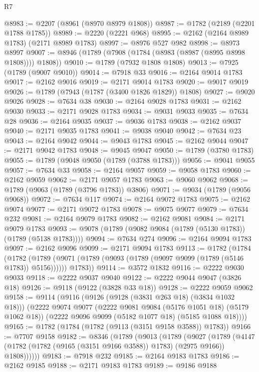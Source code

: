 \begin{lexlean}{R7}
\begin{coremodule}
@8983 := @2207 (@8961 (@8970 @8979 @1808))
@8987 := @1782 (@2189 (@2201 @1788 @1785))
@8989 := @2220 (@2221 @968)
@8995 := @2162 (@2164 @8989 @1783) (@2171 @8989 @1783)
@8997 := @8976 @527 @982
@8998 := @8973 @8997
@9007 := @8946 (@1789 (@7908 (@1784 (@8983 (@8987 (@8995 @8998 @1808)))) @1808))
@9010 := @1789 (@7932 @1808 @1808)
@9013 := @7925 (@1789 (@9007 @9010))
@9014 := @7918 @33
@9016 := @2164 @9014 @1783
@9017 := @2162 @9016
@9019 := @2171 @9014 @1783
@9020 := @9017 @9019
@9026 := @1789 (@7943 (@1787 (@3400 @1826 @1829)) @1808)
@9027 := @9020 @9026
@9028 := @7634 @38
@9030 := @2164 @9028 @1783
@9031 := @2162 @9030
@9033 := @2171 @9028 @1783
@9034 := @9031 @9033
@9035 := @7634 @28
@9036 := @2164 @9035
@9037 := @9036 @1783
@9038 := @2162 @9037
@9040 := @2171 @9035 @1783
@9041 := @9038 @9040
@9042 := @7634 @23
@9043 := @2164 @9042
@9044 := @9043 @1783
@9045 := @2162 @9044
@9047 := @2171 @9042 @1783
@9048 := @9045 @9047
@9050 := @1789 (@3780 @1783)
@9055 := @1789 (@9048 @9050 (@1789 (@3788 @1783)))
@9056 := @9041 @9055
@9057 := @7634 @33
@9058 := @2164 @9057
@9059 := @9058 @1783
@9060 := @2162 @9059
@9062 := @2171 @9057 @1783
@9063 := @9060 @9062
@9068 := @1789 (@9063 (@1789 (@3796 @1783)) @3806)
@9071 := @9034 (@1789 (@9056 @9068))
@9072 := @7634 @117
@9074 := @2164 @9072 @1783
@9075 := @2162 @9074
@9077 := @2171 @9072 @1783
@9078 := @9075 @9077
@9079 := @7634 @232
@9081 := @2164 @9079 @1783
@9082 := @2162 @9081
@9084 := @2171 @9079 @1783
@9093 := @9078 (@1789 (@9082 @9084 (@1789 (@5130 @1783)) (@1789 (@5138 @1783))))
@9094 := @7634 @274
@9096 := @2164 @9094 @1783
@9097 := @2162 @9096
@9099 := @2171 @9094 @1783
@9113 := @1782
    (@1784
      (@1782
        (@1789 (@9071 (@1789 (@9093 (@1789 (@9097 @9099 (@1789 (@5146 @1783)) @5156))))))
        @1783))
@9114 := @3572 @1832
@9116 := @2222 @9030 @9033
@9118 := @2222 @9037 @9040
@9122 := @2222 @9044 @9047 (@3826 @18)
@9126 := @9118 (@9122 (@3828 @33 @18))
@9128 := @2222 @9059 @9062
@9158 := @9114
    (@9116
      (@9126 (@9128 (@3831 @263 @18) (@3834 @1032 @18)))
      (@2222
        @9074
        @9077
        (@2222 @9081 @9084 (@5176 @1051 @18) (@5179 @1062 @18))
        (@2222 @9096 @9099 (@5182 @1077 @18) (@5185 @1088 @18))))
@9165 := @1782 (@1784 (@1782 (@9113 (@3151 @9158 @3588)) @1783))
@9166 := @7707 @9158
@9182 := @8346
    (@1789
      (@9013
        (@1789
          (@9027
            (@1789
              (@4147 (@1782 (@1782 (@9165 (@3151 @9166 @3588)) @1783) (@2975 @9166)) @1808))))))
@9183 := @7918 @232
@9185 := @2164 @9183 @1783
@9186 := @2162 @9185
@9188 := @2171 @9183 @1783
@9189 := @9186 @9188

\end{coremodule}
\end{lexlean}
